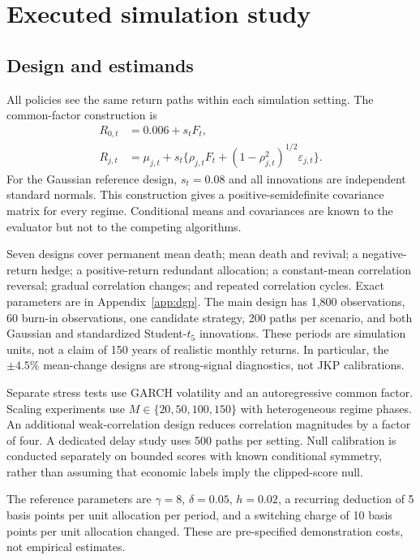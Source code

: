 \section{Executed simulation study}\label{sec:sim}
\subsection{Design and estimands}
All policies see the same return paths within each simulation setting. The common-factor construction is
\begin{align}
 R_{0,t}&=0.006+s_tF_t,\\
 R_{j,t}&=\mu_{j,t}+s_t\{\rho_{j,t}F_t+(1-\rho_{j,t}^2)^{1/2}\varepsilon_{j,t}\}.
\end{align}
For the Gaussian reference design, $s_t=0.08$ and all innovations are independent standard normals. This construction gives a positive-semidefinite covariance matrix for every regime. Conditional means and covariances are known to the evaluator but not to the competing algorithms.

Seven designs cover permanent mean death; mean death and revival; a negative-return hedge; a positive-return redundant allocation; a constant-mean correlation reversal; gradual correlation changes; and repeated correlation cycles. Exact parameters are in Appendix~\ref{app:dgp}. The main design has 1,800 observations, 60 burn-in observations, one candidate strategy, 200 paths per scenario, and both Gaussian and standardized Student-$t_5$ innovations. These periods are simulation units, not a claim of 150 years of realistic monthly returns. In particular, the $\pm4.5\%$ mean-change designs are strong-signal diagnostics, not JKP calibrations.

Separate stress tests use GARCH volatility and an autoregressive common factor. Scaling experiments use $M\in\{20,50,100,150\}$ with heterogeneous regime phases. An additional weak-correlation design reduces correlation magnitudes by a factor of four. A dedicated delay study uses 500 paths per setting. Null calibration is conducted separately on bounded scores with known conditional symmetry, rather than assuming that economic labels imply the clipped-score null.

The reference parameters are $\gamma=8$, $\delta=0.05$, $h=0.02$, a recurring deduction of 5 basis points per unit allocation per period, and a switching charge of 10 basis points per unit allocation changed. These are pre-specified demonstration costs, not empirical estimates.

